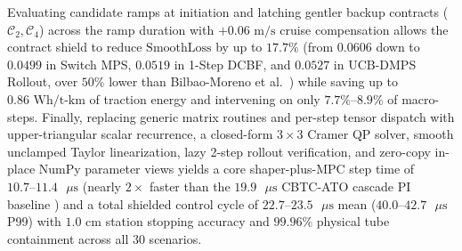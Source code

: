\documentclass[10pt,a4paper]{article}
\begin{document}
Evaluating candidate ramps at initiation and latching gentler backup contracts ($\mathcal{C}_2, \mathcal{C}_4$) across the ramp duration with $+0.06\text{ m/s}$ cruise compensation allows the contract shield to reduce $\text{SmoothLoss}$ by up to $17.7\%$ (from $0.0606$ down to $0.0499$ in Switch MPS, $0.0519$ in 1-Step DCBF, and $0.0527$ in UCB-DMPS Rollout, over $50\%$ lower than Bilbao-Moreno et al.\ \cite{bilbao2025}) while saving up to $0.86\text{ Wh/t-km}$ of traction energy and intervening on only $7.7\%\text{--}8.9\%$ of macro-steps. Finally, replacing generic matrix routines and per-step tensor dispatch with upper-triangular scalar recurrence, a closed-form $3\times 3$ Cramer QP solver, smooth unclamped Taylor linearization, lazy 2-step rollout verification, and zero-copy in-place NumPy parameter views yields a core shaper-plus-MPC step time of $10.7\text{--}11.4\text{ }\mu\text{s}$ (nearly $2\times$ faster than the $19.9\text{ }\mu\text{s}$ CBTC-ATO cascade PI baseline \cite{bilbao2025}) and a total shielded control cycle of $22.7\text{--}23.5\text{ }\mu\text{s}$ mean ($40.0\text{--}42.7\text{ }\mu\text{s}$ P99) with $1.0\text{ cm}$ station stopping accuracy and $99.96\%$ physical tube containment across all 30 scenarios.
\end{document}
